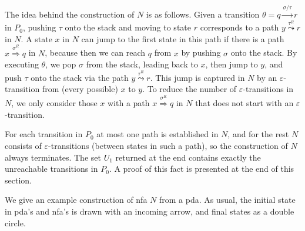 \documentclass{llncs}
\newcommand{\eps}{\ensuremath{\varepsilon}}
\begin{document}
The idea behind the construction of $N$ is as follows. Given a transition
$\theta=q\stackrel{\sigma/\tau}{\rightarrow}r$ in $P_0$, pushing $\tau$ onto the stack and moving to state $r$
corresponds to a path $y\stackrel{\tau^R}{\leadsto}r$ in $N$. A state $x$ in $N$ can jump
to the first state in this path if there is a path $x\stackrel{\sigma^R}{\Rightarrow}q$ in $N$,
because then we can reach $q$ from $x$ by pushing $\sigma$ onto the stack.
By executing $\theta$, we pop $\sigma$ from the stack, leading back to $x$, then jump to $y$, and push $\tau$ onto the stack
via the path $y\stackrel{\tau^R}{\leadsto}r$.
This jump is captured in $N$ by an $\eps$-transition from (every possible) $x$ to $y$.
To reduce the number of $\eps$-transitions in $N$, we only consider those $x$ with a path $x\stackrel{\sigma^R}{\Rightarrow}q$
in $N$ that does not start with an $\eps$-transition.

For each transition in $P_0$ at most one path is established in $N$, and for the rest $N$ consists of
$\eps$-transitions (between states in such a path), so the construction of $N$ always terminates.
The set $U_1$ returned at the end contains exactly the unreachable transitions in $P_0$.
A proof of this fact is presented at the end of this section.

We give an example construction of nfa $N$ from a pda.
As usual, the initial state in pda's and nfa's is drawn with an incoming arrow, and final states as a double circle.
\end{document}
